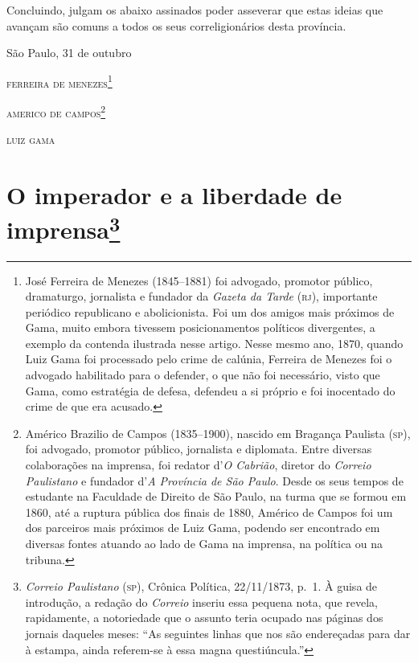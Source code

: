 Concluindo, julgam os abaixo assinados poder asseverar que estas ideias
que avançam são comuns a todos os seus correligionários desta província.

\begin{flushright}
São Paulo, 31 de outubro

\textsc{ferreira de menezes}\footnote{ José Ferreira de Menezes (1845--1881) foi
  advogado, promotor público, dramaturgo, jornalista e fundador da
  \emph{Gazeta da Tarde} (\textsc{rj}), importante periódico republicano e
  abolicionista. Foi um dos amigos mais próximos de Gama, muito embora
  tivessem posicionamentos políticos divergentes, a exemplo da contenda
  ilustrada nesse artigo. Nesse mesmo ano, 1870, quando Luiz Gama foi
  processado pelo crime de calúnia, Ferreira de Menezes foi o advogado
  habilitado para o defender, o que não foi necessário, visto que Gama,
  como estratégia de defesa, defendeu a si próprio e foi inocentado do
  crime de que era acusado.}

\textsc{americo de campos}\footnote{ Américo Brazilio de Campos (1835--1900),
  nascido em Bragança Paulista (\textsc{sp}), foi advogado, promotor público,
  jornalista e diplomata. Entre diversas colaborações na imprensa, foi
  redator d'\emph{O Cabrião}, diretor do \emph{Correio Paulistano} e
  fundador d'\emph{A Província de São Paulo}. Desde os seus tempos de
  estudante na Faculdade de Direito de São Paulo, na turma que se formou
  em 1860, até a ruptura pública dos finais de 1880, Américo de Campos
  foi um dos parceiros mais próximos de Luiz Gama, podendo ser
  encontrado em diversas fontes atuando ao lado de Gama na imprensa, na
  política ou na tribuna.}

\textsc{luiz gama}
\end{flushright}

\chapter{O imperador e a liberdade de imprensa\footnote{\emph{Correio Paulistano} (\textsc{sp}), Crônica Política,
  22/11/1873, p.~1. À guisa de introdução, a redação do \emph{Correio}
  inseriu essa pequena nota, que revela, rapidamente, a notoriedade que
  o assunto teria ocupado nas páginas dos jornais daqueles meses: ``As
  seguintes linhas que nos são endereçadas para dar à estampa, ainda
  referem-se à essa magna questiúncula.''}} %

